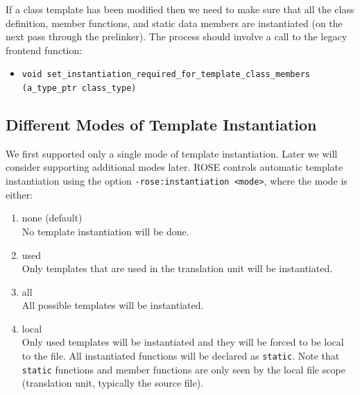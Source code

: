 \begin{enumerate}
\begin{itemize}
                     If a class template has been modified then we need to make sure that all the 
                     class definition,
                     member functions, and 
                     static data members
                     are instantiated (on the next pass through the prelinker). The process should 
                     involve a call to the legacy frontend function:
                     \begin{itemize}
                          \item {\tt void set\_instantiation\_required\_for\_template\_class\_members (a\_type\_ptr class\_type)}
                     \end{itemize}

          \end{itemize}
\end{enumerate}

\subsection{Different Modes of Template Instantiation}
   
    We first supported only a single mode of template instantiation. Later we will
consider supporting additional modes later.
ROSE controls automatic template instantiation using the option
{\tt -rose:instantiation <mode>}, where the mode is either:
\begin{enumerate}
   \item none (default) \\
         No template instantiation will be done.
   \item used \\
         Only templates that are used in the translation unit will be instantiated.
   \item all \\
         All possible templates will be instantiated.
   \item local \\
         Only used templates will be instantiated and they will be forced to be local to
         the file.  All instantiated functions will be declared as {\tt static}.  Note that
         {\tt static} functions and member functions are only seen by the local file scope
         (translation unit, typically the source file).
\end{enumerate}


